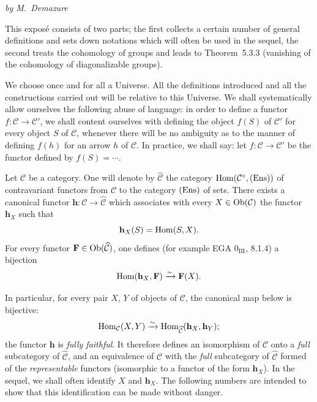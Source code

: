 \label{I}

\begin{center}
\textit{by M.~Demazure}
\end{center}

{\renewcommand{\thefootnote}{(0)}}%
This expos\'e consists of two parts; the first collects a certain number
of general definitions and sets down notations which will often be used
in the sequel, the second treats the cohomology of groups and leads to
Theorem~5.3.3 (vanishing of the cohomology of diagonalizable groups).

We choose once and for all a
Universe.%
{\renewcommand{\thefootnote}{(1)}}
All the definitions introduced and all the constructions carried out
will be relative to this Universe. We shall systematically allow
ourselves the following abuse of language: in order to define a functor
\(f\colon\mathcal{C}\to\mathcal{C}'\), we shall content ourselves with
defining the object \(f(S)\) of \(\mathcal{C}'\) for every object \(S\)
of \(\mathcal{C}\), whenever there will be no ambiguity as to the manner
of defining \(f(h)\) for an arrow \(h\) of \(\mathcal{C}\). In practice,
we shall say: let \(f\colon\mathcal{C}\to\mathcal{C}'\) be the functor
defined by \(f(S)=\cdots\).

\label{I.sec.1}

Let \(\mathcal{C}\) be a category. One will denote by
\(\widehat{\mathcal{C}}\) the category
\(\operatorname{Hom}(\mathcal{C}^{\circ},\textup{(Ens)})\) of contravariant functors from
\(\mathcal{C}\) to the category \(\textup{(Ens)}\) of
sets.%
{\renewcommand{\thefootnote}{(2)}}
There exists a canonical functor
\(\mathbf{h}\colon\mathcal{C}\to\widehat{\mathcal{C}}\) which associates
with every \(X\in\operatorname{Ob}(\mathcal{C})\) the functor \(\mathbf{h}_{X}\) such
that
\[
\mathbf{h}_{X}(S)=\operatorname{Hom}(S,X).
\]
For every functor \(\mathbf{F}\in\operatorname{Ob}(\widehat{\mathcal{C}})\), one defines
(\cf for example EGA \(0_{\mathrm{III}}\), 8.1.4) a
bijection%
{\renewcommand{\thefootnote}{(3)}}
\[
\operatorname{Hom}(\mathbf{h}_{X},\mathbf{F})\xrightarrow{\sim}\mathbf{F}(X).
\]

In particular, for every pair \(X\), \(Y\) of objects of \(\mathcal{C}\),
the canonical map below is bijective:
\[
\operatorname{Hom}_{\mathcal{C}}(X,Y)\xrightarrow{\sim}
\operatorname{Hom}_{\widehat{\mathcal{C}}}(\mathbf{h}_{X},\mathbf{h}_{Y});
\]
\ie the functor \(\mathbf{h}\) is \emph{fully faithful}. It therefore
defines an isomorphism of \(\mathcal{C}\) onto a \emph{full} subcategory of
\(\widehat{\mathcal{C}}\), and an equivalence of \(\mathcal{C}\) with the
\emph{full} subcategory of \(\widehat{\mathcal{C}}\) formed of the
\emph{representable} functors (\ie isomorphic to a functor of the form
\(\mathbf{h}_{X}\)). In the sequel, we shall often identify \(X\) and
\(\mathbf{h}_{X}\). The following numbers are intended to show that this
identification can be made without danger.

